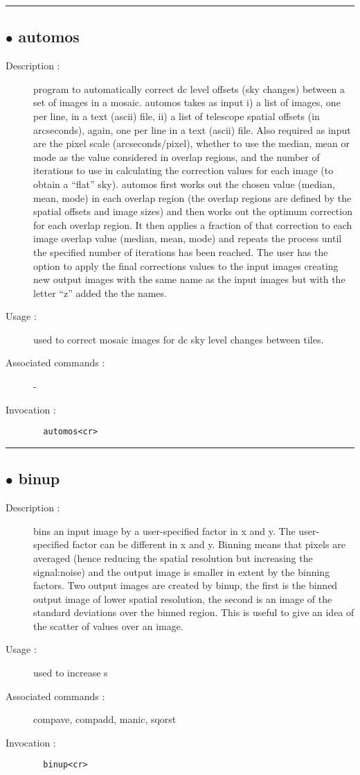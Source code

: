 \hrule \subsection*{$\bullet$ automos}
\begin{description}
\item[Description :] program to automatically correct dc level offsets (sky changes)
between a set of images in a mosaic.  automos takes as input i) a list of
images, one per line, in a text (ascii) file, ii) a list of telescope
spatial offsets (in arcseconds), again, one per line in a text (ascii)
file.  Also required as input are the pixel scale (arcseconds/pixel),
whether to use the median, mean or mode as the value considered in
overlap regions, and the number of iterations to use in calculating the
correction values for each image (to obtain a ``flat'' sky).  automos first
works out the chosen value (median, mean, mode) in each overlap region
(the overlap regions are defined by the spatial offsets and image sizes)
and then works out the optimum correction for each overlap region. It
then applies a fraction of that correction to each image overlap value
(median, mean, mode) and repeats the process until the specified number
of iterations has been reached.  The user has the option to apply the
final corrections values to the input images creating new output images
with the same name as the input images but with the letter ``z'' added the
the names.
\item[Usage :] used to correct mosaic images for dc sky level changes between
tiles.
\item[Associated commands :] -
\item[Invocation :]

\verb+  automos<cr> +\end{description}

\hrule \subsection*{$\bullet$ binup}
\begin{description}
\item[Description :] bins an input image by a user-specified factor in x and y.  The
user-specified factor can be different in x and y.  Binning means that
pixels are averaged (hence reducing the spatial resolution but increasing
the signal:noise) and the output image is smaller in extent by the
binning factors.  Two output images are created by binup, the first is
the binned output image of lower spatial resolution, the second is an
image of the standard deviations over the binned region.  This is useful
to give an idea of the scatter of values over an image.  
\item[Usage :] used to increase s
\item[Associated commands :] compave, compadd, manic, sqorst
\item[Invocation :]

\verb+  binup<cr> +\end{description}

